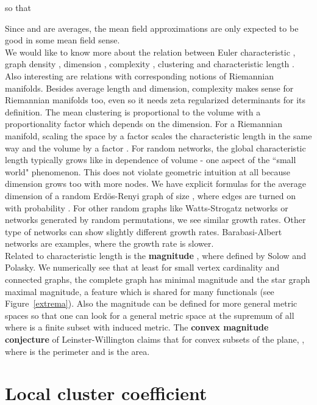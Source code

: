 \documentclass[12pt]{amsart}
\theoremstyle{definition}
\begin{document}
so that

Since  and  are averages, the mean field approximations are 
only expected to be good in some mean field sense.  \\


We would like to know more about the relation between Euler characteristic , 
graph density , dimension , complexity , clustering  
and characteristic length . Also interesting are relations with corresponding notions 
of Riemannian manifolds. 
Besides average length and dimension, complexity makes sense for Riemannian manifolds too, even so it
needs zeta regularized determinants for its definition. 
The mean clustering  is proportional to the volume with a proportionality factor which depends 
on the dimension.  For a Riemannian manifold, scaling the space by a factor  scales the 
characteristic length in the same way and the volume by a factor . For random networks, 
the global characteristic length
typically grows like  in dependence of volume  - one aspect of the  ``small world" phenomenon. 
This does not violate geometric intuition at all because dimension grows too with more nodes. 
We have explicit formulas \cite{randomgraph} for the average dimension of a random 
Erd\"os-Renyi graph of size , where edges are turned on with probability . 
For other random graphs like Watts-Strogatz networks or networks generated by random permutations, 
we see similar growth rates. Other type of networks can show slightly different growth rates.
Barabasi-Albert networks are examples, where the growth rate is slower. \\

Related to characteristic length is the {\bf magnitude} , where
 defined by Solow and Polasky. We numerically see that at least for
small vertex cardinality  and connected graphs,
the complete graph has minimal magnitude and the star graph maximal magnitude, a feature which
is shared for many functionals (see Figure~\ref{extrema}). 
Also the magnitude can be defined for more general metric spaces so that one can look for a general metric 
space at the supremum of all  where  is a finite subset with induced metric. 
The {\bf convex magnitude conjecture} of Leinster-Willington claims that for convex 
subsets of the plane, , where  is the perimeter 
and  is the area.

\section{Local cluster coefficient}
\end{document}
